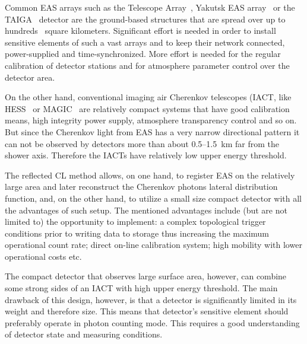 \documentclass[final,5p,times,twocolumn]{elsarticle}
\begin{document}

Common EAS arrays such as the Telescope Array~\cite{abu12}, Yakutsk EAS array~\cite{Yakutsk19} or the TAIGA~\cite{TAIGA20} detector are the ground-based structures that are spread over up to hundreds~\cite{abu12} square kilometers. Significant effort is needed in order to install sensitive elements of such a vast arrays and to keep their network connected, power-supplied and time-synchronized. More effort is needed for the regular calibration of detector stations and for atmosphere parameter control over the detector area. 

On the other hand, conventional imaging air Cherenkov telescopes (IACT, like HESS~\cite{HESS03a, HESS03b} or MAGIC~\cite{MAGIC16-1, MAGIC16-2} are relatively compact systems that have good calibration means, high integrity power supply, atmosphere transparency control and so on. But since the Cherenkov light from EAS has a very narrow directional pattern it can not be observed by detectors more than about 0.5--1.5~km far from the shower axis. Therefore the IACTs have relatively low upper energy threshold.

The reflected CL method allows, on one hand, to register EAS on the relatively large area and later reconstruct the Cherenkov photons lateral distribution function, and, on the other hand, to utilize a small size compact detector with all the advantages of such setup. The mentioned advantages include (but are not limited to) the opportunity to implement: a complex topological trigger conditions prior to writing data to storage thus increasing the maximum operational count rate; direct on-line calibration system; high mobility with lower operational costs etc.

The compact detector that observes large surface area, however, can combine some strong sides of an IACT with high upper energy threshold. The main drawback of this design, however, is that a detector is significantly limited in its weight and therefore size. This means that detector's sensitive element should preferably operate in photon counting mode. This requires a good understanding of detector state and measuring conditions.
\end{document}
